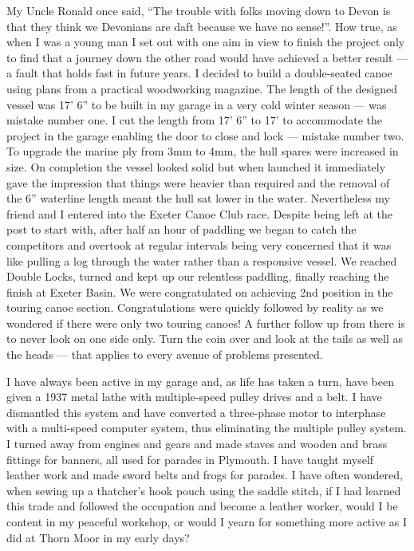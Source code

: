 
My Uncle Ronald once said, ``The trouble with folks moving down to Devon is that
they think we Devonians are daft because we have no sense!''. How true, as when
I was a young man I set out with one aim in view to finish the project only to
find that a journey down the other road would have achieved a better result ---
a fault that holds fast in future years. I decided to build a double-seated
canoe using plans from a practical woodworking magazine. The length of the
designed vessel was 17' 6'' to be built in my garage in a very cold winter
season --- was mistake number one. I cut the length from 17' 6'' to 17' to
accommodate the project in the garage enabling the door to close and lock ---
mistake number two. To upgrade the marine ply from 3mm to 4mm, the hull spares
were increased in size. On completion the vessel looked solid but when launched
it immediately gave the impression that things were heavier than required and
the removal of the 6'' waterline length meant the hull sat lower in the water.
Nevertheless my friend and I entered into the Exeter Canoe Club race. Despite
being left at the post to start with, after half an hour of paddling we began
to catch the competitors and overtook at regular intervals being very concerned
that it was like pulling a log through the water rather than a responsive
vessel. We reached Double Locks, turned and kept up our relentless paddling,
finally reaching the finish at Exeter Basin. We were congratulated on achieving
2nd position in the touring canoe section. Congratulations were quickly
followed by reality as we wondered if there were only two touring canoes! A
further follow up from there is to never look on one side only. Turn the coin
over and look at the tails as well as the heads --- that applies to every
avenue of problems presented.

I have always been active in my garage and, as life has taken a turn, have been
given a 1937 metal lathe with multiple-speed pulley drives and a belt. I have
dismantled this system and have converted a three-phase motor to interphase
with a multi-speed computer system, thus eliminating the multiple pulley
system. I turned away from engines and gears and made staves and wooden and
brass fittings for banners, all used for parades in Plymouth. I have taught
myself leather work and made sword belts and frogs for parades. I have often
wondered, when sewing up a thatcher's hook pouch using the saddle stitch, if I
had learned this trade and followed the occupation and become a leather worker,
would I be content in my peaceful workshop, or would I yearn for something more
active as I did at Thorn Moor in my early days?

